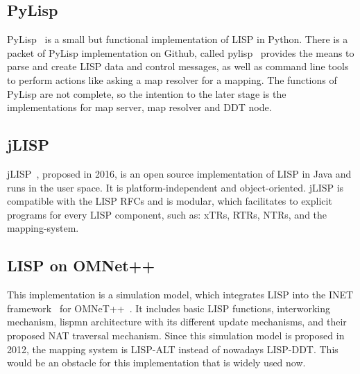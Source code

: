 \subsection{PyLisp}
\label{subsec:implementation_pylisp}
PyLisp~\cite{pylisp} is a small but functional implementation of LISP in Python. There is a packet of PyLisp implementation on Github, called pylisp~\cite{pylispgithub} provides the means to parse and create LISP data and control messages, as well as command line tools to perform actions like asking a map resolver for a mapping. The functions of PyLisp are not complete, so the intention to the later stage is the implementations for map server, map resolver and DDT node.


\subsection{jLISP}
\label{subsec:implementation_jLISP}
jLISP~\cite{stockmayer2016jlisp}, proposed in 2016, is an open source implementation of LISP in Java and runs in the user space. It is platform-independent and object-oriented. jLISP is compatible with the LISP RFCs and is modular, which facilitates to explicit programs for every LISP component, such as: xTRs, RTRs, NTRs, and the mapping-system.


\subsection{LISP on OMNet++}
\label{subsec:implementation_OMNet}
This implementation is a simulation model, which integrates LISP into the INET framework~\cite{klein2012integration} for OMNeT++~\cite{omnetpp}. It includes basic LISP functions, interworking mechanism, \acrshort{lispmn} architecture with its different update mechanisms, and their proposed NAT traversal mechanism. Since this simulation model is proposed in 2012, the mapping system is LISP-ALT instead of nowadays LISP-DDT. This would be an obstacle for this implementation that is widely used now.


